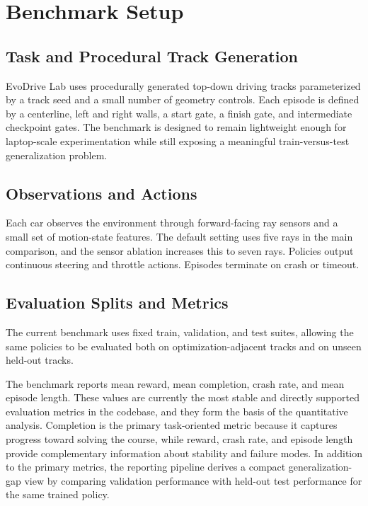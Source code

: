 \section{Benchmark Setup}

\subsection{Task and Procedural Track Generation}

EvoDrive Lab uses procedurally generated top-down driving tracks parameterized by a track seed and a small number of geometry controls. Each episode is defined by a centerline, left and right walls, a start gate, a finish gate, and intermediate checkpoint gates. The benchmark is designed to remain lightweight enough for laptop-scale experimentation while still exposing a meaningful train-versus-test generalization problem.

\subsection{Observations and Actions}

Each car observes the environment through forward-facing ray sensors and a small set of motion-state features. The default setting uses five rays in the main comparison, and the sensor ablation increases this to seven rays. Policies output continuous steering and throttle actions. Episodes terminate on crash or timeout.

\subsection{Evaluation Splits and Metrics}

The current benchmark uses fixed train, validation, and test suites, allowing the same policies to be evaluated both on optimization-adjacent tracks and on unseen held-out tracks.

The benchmark reports mean reward, mean completion, crash rate, and mean episode length. These values are currently the most stable and directly supported evaluation metrics in the codebase, and they form the basis of the quantitative analysis. Completion is the primary task-oriented metric because it captures progress toward solving the course, while reward, crash rate, and episode length provide complementary information about stability and failure modes. In addition to the primary metrics, the reporting pipeline derives a compact generalization-gap view by comparing validation performance with held-out test performance for the same trained policy.
